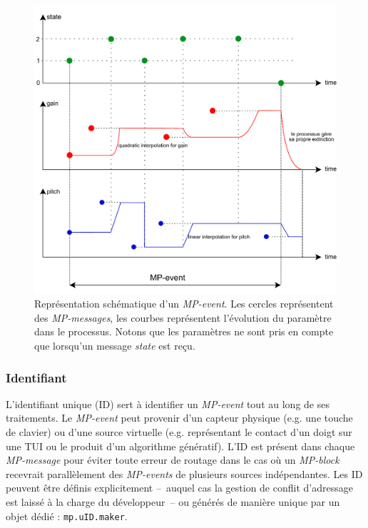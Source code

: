 \begin{figure}[!htbp]
	\captionsetup{format=plain}
	\includegraphics[width=\textwidth]{gfx/04_algorithms/MP-event-model.pdf}
	\caption[Représentation schématique d'un \textit{MP-event}]{Représentation schématique d'un \textit{MP-event}. Les cercles représentent des \textit{MP-messages}, les courbes représentent l'évolution du paramètre dans le processus. Notons que les paramètres ne sont pris en compte que lorsqu'un message \textit{state} est reçu.}
	\label{fig:algorithms:MP-event-model}
\end{figure}


\subsubsection{Identifiant}

\noindent L'identifiant unique (ID) sert à identifier un \textit{MP-event} tout au long de ses traitements. Le \textit{MP-event} peut provenir d'un capteur physique (e.g. une touche de clavier) ou d'une source virtuelle (e.g. représentant le contact d'un doigt sur une \gls{TUI} ou le produit d'un algorithme génératif). L'ID est présent dans chaque \textit{MP-message} pour éviter toute erreur de routage dans le cas où un \textit{MP-block} recevrait parallèlement des \textit{MP-events} de plusieurs sources indépendantes. Les ID peuvent être définis explicitement --~auquel cas la gestion de conflit d'adressage est laissé à la charge du développeur~-- ou générés de manière unique par un objet dédié : \verb|mp.uID.maker|.

